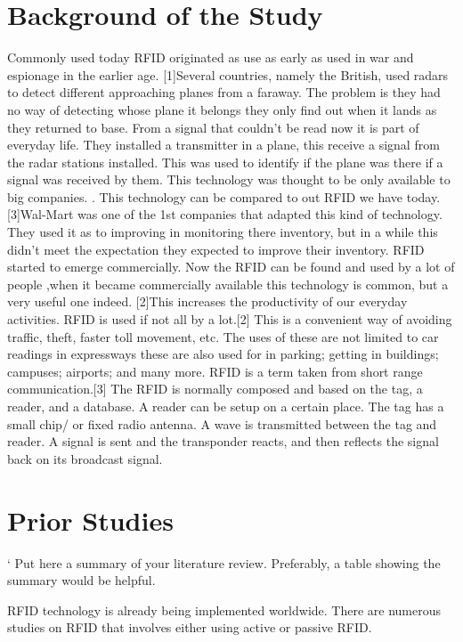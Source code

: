 \section{Background of the Study}

	Commonly used today RFID originated as use as early as used in war and espionage in the earlier age. [1]Several countries, namely the British, used radars to detect different approaching planes from a faraway. The problem is they had no way of detecting whose plane it belongs they only find out when it lands as they returned to base. From a signal that couldn’t be read now it is part of everyday life. They installed a transmitter in a plane, this receive a signal from the radar stations installed. This was used to identify if the plane was there if a signal was received by them. This technology was thought to be only available to big companies. . This technology can be compared to out RFID we have today. [3]Wal-Mart was one of the 1st companies that adapted this kind of technology. They used it as to improving in monitoring there inventory, but in a while this didn’t meet the expectation they expected to improve their inventory. RFID started to emerge commercially. Now the RFID can be found and used by a lot of people ,when it became commercially available this technology is common, but a very useful one indeed. 
[2]This increases the productivity of our everyday activities. RFID is used if not all by a lot.[2] This is a convenient way of avoiding traffic, theft, faster toll movement, etc. The uses of these are not limited to car readings in expressways these are also used for in parking; getting in buildings; campuses; airports; and many more. RFID is a term taken from short range communication.[3] The RFID is normally composed and based on the tag, a reader, and a database. A reader can be setup on a certain place. The tag has a small chip/ or fixed radio antenna. A wave is transmitted between the tag and reader. A signal is sent and the transponder reacts, and then reflects the signal back on its broadcast signal.

\section{Prior Studies}
`
Put here a summary of your literature review.  Preferably, a table showing the summary would be helpful. 

RFID technology is already being implemented worldwide. There are numerous studies on RFID that involves either using active or passive RFID. 
